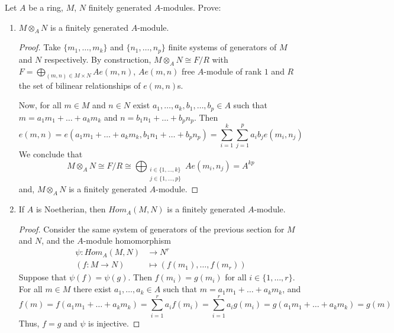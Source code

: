 \begin{problem}
    Let $A$ be a ring, $M$, $N$ finitely generated $A$-modules.
    Prove:
    \begin{enumerate}[label=(\theproblem.\arabic*),ref=\theproblem.\arabic*]
        \item $M \otimes_A N$ is a finitely generated $A$-module.
            \begin{sol}
                \begin{proof}
                    Take $\{m_1, \dots, m_k\}$ and $\{n_1, \dots, n_p\}$ finite systems of generators of $M$ and $N$ respectively.
                    By construction, $M \otimes_A N \cong F/R$ with $F = \bigoplus_{(m,n) \in M \times N} A e(m,n)$, $A e(m,n)$ free
                    $A$-module of rank $1$ and $R$ the set of bilinear relationships of $e(m,n)$s.

                    Now, for all $m \in M$ and $n \in N$ exist $a_1, \dots, a_k, b_1, \dots, b_p \in A$ such that $m = a_1 m_1 + \dots + a_k m_k$ and $n = b_1 n_1 + \dots + b_p n_p$.
                    Then
                    \[
                       e(m,n) = e(a_1 m_1 + \dots + a_k m_k, b_1 n_1 + \dots + b_p n_p) = \sum_{i=1}^{k}\sum_{j=1}^{p} a_i b_j e(m_i, n_j)
                    \]
                    We conclude that
                    \[
                        M \otimes_A N \cong F/R \cong \bigoplus_{\substack{i \in \{1,\dots,k\} \\ j \in \{1,\dots,p\}}} A e(m_i,n_j) = A^{kp}
                    \]
                    and, $M \otimes_A N$ is a finitely generated $A$-module.
                \end{proof}
            \end{sol}
        \item If $A$ is Noetherian, then $Hom_A(M,N)$ is a finitely generated $A$-module.
            \begin{sol}
                \begin{proof}
                    Consider the same system of generators of the previous section for $M$ and $N$, and the $A$-module homomorphism
                    \begin{align*}
                        \psi\colon Hom_A(M,N) &\to N^r \\
                        (f: M \rightarrow N) &\mapsto (f(m_1), \dots, f(m_r))
                    \end{align*}
                    Suppose that $\psi(f) = \psi(g)$.
                    Then $f(m_i) = g(m_i)$ for all $i \in \{1, \dots, r\}$.
                    For all $m \in M$ there exist $a_1, \dots, a_k \in A$ such that $m = a_1 m_1 + \dots + a_k m_k$, and
                    \[
                        f(m) = f(a_1 m_1 + \dots + a_k m_k) = \sum_{i=1}^{r} a_i f(m_i) = \sum_{i=1}^{r} a_i g(m_i) = g(a_1 m_1 + \dots + a_k m_k) = g(m)
                    \]
                    Thus, $f = g$ and $\psi$ is injective.


\end{proof}
\end{sol}
\end{enumerate}
\end{problem}
